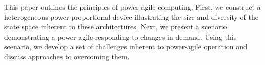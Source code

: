 This paper outlines the principles of power-agile computing. First, we
construct a heterogeneous power-proportional device illustrating the size and
diversity of the state space inherent to these architectures. Next, we
present a scenario demonstrating a power-agile responding to changes in
demand. Using this scenario, we develop a set of challenges inherent to
power-agile operation and discuss approaches to overcoming them.
